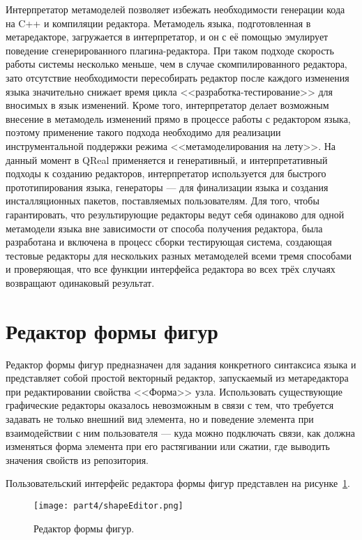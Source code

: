 Интерпретатор метамоделей позволяет избежать необходимости генерации кода на C++ и 
компиляции редактора. Метамодель языка, подготовленная в метаредакторе, загружается 
в интерпретатор, и он с её помощью эмулирует поведение сгенерированного плагина-редактора. 
При таком подходе скорость работы системы несколько меньше, чем в случае скомпилированного 
редактора, зато отсутствие необходимости пересобирать редактор после каждого изменения 
языка значительно снижает время цикла <<разработка-тестирование>> для вносимых в язык 
изменений. Кроме того, интерпретатор делает возможным внесение в метамодель изменений 
прямо в процессе работы с редактором языка, поэтому применение такого подхода необходимо 
для реализации инструментальной поддержки режима <<метамоделирования на лету>>.
На данный момент в QReal применяется и генеративный, и интерпретативный подходы к 
созданию редакторов, интерпретатор используется для быстрого прототипирования языка, 
генераторы --- для финализации языка и создания инсталляционных пакетов, поставляемых 
пользователям. Для того, чтобы гарантировать, что результирующие редакторы ведут себя 
одинаково для одной метамодели языка вне зависимости от способа получения редактора, 
была разработана и включена в процесс сборки тестирующая система, создающая тестовые 
редакторы для нескольких разных метамоделей всеми тремя способами и проверяющая, что 
все функции интерфейса редактора во всех трёх случаях возвращают одинаковый результат.

\section{Редактор формы фигур}
Редактор формы фигур предназначен для задания конкретного синтаксиса языка и представляет 
собой простой векторный редактор, запускаемый из метаредактора при редактировании свойства 
<<Форма>> узла. Использовать существующие графические редакторы оказалось невозможным 
в связи с тем, что требуется задавать не только внешний вид элемента, но и поведение 
элемента при взаимодействии с ним пользователя --- куда можно подключать связи, как 
должна изменяться форма элемента при его растягивании или сжатии, где выводить значения 
свойств из репозитория.

Пользовательский интерфейс редактора формы фигур представлен на рисунке~\ref{image:shapeEditor}.

\begin{figure} [ht]
	\begin{center}
		\texttt{[image: part4/shapeEditor.png]}
		\caption{Редактор формы фигур.}
		\label{image:shapeEditor}
	\end{center}
\end{figure}

